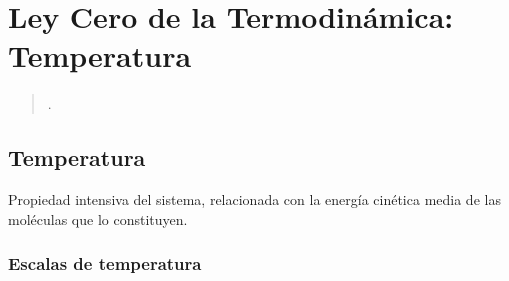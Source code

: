 %
%


\section{Ley Cero de la Termodinámica: Temperatura}

\begin{quote}
    \textit{} \cite{gracia_c_iq3201_2020}.
\end{quote}

    \subsection{Temperatura}
    
    Propiedad intensiva del sistema, relacionada con la energía cinética media de las moléculas que lo constituyen.

        \subsubsection{Escalas de temperatura}
        
